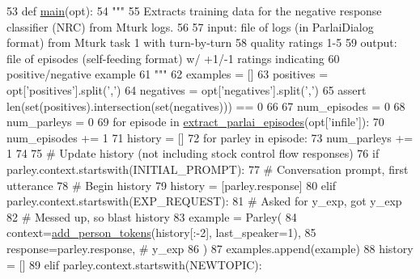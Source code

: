 \begin{DoxyCode}
53 \textcolor{keyword}{def }\hyperlink{namespaceprojects_1_1self__feeding_1_1scripts_1_1convert__chatted__to__identity_ac409d1c26364c39762dd2357afdaf64a}{main}(opt):
54     \textcolor{stringliteral}{"""}
55 \textcolor{stringliteral}{    Extracts training data for the negative response classifier (NRC) from Mturk logs.}
56 \textcolor{stringliteral}{}
57 \textcolor{stringliteral}{    input: file of logs (in ParlaiDialog format) from Mturk task 1 with turn-by-turn}
58 \textcolor{stringliteral}{        quality ratings 1-5}
59 \textcolor{stringliteral}{    output: file of episodes (self-feeding format) w/ +1/-1 ratings indicating}
60 \textcolor{stringliteral}{        positive/negative example}
61 \textcolor{stringliteral}{    """}
62     examples = []
63     positives = opt[\textcolor{stringliteral}{'positives'}].split(\textcolor{stringliteral}{','})
64     negatives = opt[\textcolor{stringliteral}{'negatives'}].split(\textcolor{stringliteral}{','})
65     \textcolor{keyword}{assert} len(set(positives).intersection(set(negatives))) == 0
66 
67     num\_episodes = 0
68     num\_parleys = 0
69     \textcolor{keywordflow}{for} episode \textcolor{keywordflow}{in} \hyperlink{namespaceprojects_1_1self__feeding_1_1utils_a7bfa2fe610a2d0da7968b1a2662e0c23}{extract\_parlai\_episodes}(opt[\textcolor{stringliteral}{'infile'}]):
70         num\_episodes += 1
71         history = []
72         \textcolor{keywordflow}{for} parley \textcolor{keywordflow}{in} episode:
73             num\_parleys += 1
74 
75             \textcolor{comment}{# Update history (not including stock control flow responses)}
76             \textcolor{keywordflow}{if} parley.context.startswith(INITIAL\_PROMPT):
77                 \textcolor{comment}{# Conversation prompt, first utterance}
78                 \textcolor{comment}{# Begin history}
79                 history = [parley.response]
80             \textcolor{keywordflow}{elif} parley.context.startswith(EXP\_REQUEST):
81                 \textcolor{comment}{# Asked for y\_exp, got y\_exp}
82                 \textcolor{comment}{# Messed up, so blast history}
83                 example = Parley(
84                     context=\hyperlink{namespaceprojects_1_1self__feeding_1_1utils_a3f3d055dc6c4058057baae7b240de5ec}{add\_person\_tokens}(history[:-2], last\_speaker=1),
85                     response=parley.response,  \textcolor{comment}{# y\_exp}
86                 )
87                 examples.append(example)
88                 history = []
89             \textcolor{keywordflow}{elif} parley.context.startswith(NEWTOPIC):

\end{DoxyCode}
